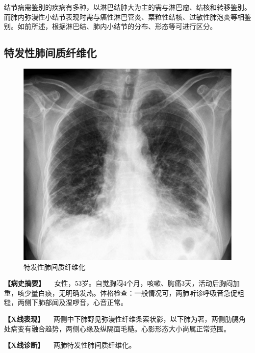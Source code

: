 结节病需鉴别的疾病有多种，以淋巴结肿大为主的需与淋巴瘤、结核和转移鉴别。而肺内弥漫性小结节表现时需与癌性淋巴管炎、粟粒性结核、过敏性肺泡炎等相鉴别。如前所述，根据淋巴结、肺内小结节的分布、形态等可进行区分。

\subsection{特发性肺间质纤维化}

\begin{figure}[!htbp]
 \centering
 \includegraphics{./images/Image00181.jpg}
 \captionsetup{justification=centering}
 \caption{特发性肺间质纤维化}
 \label{fig3-10-2}
  \end{figure} 

\textbf{【病史摘要】}
　女性，53岁。自觉胸闷4个月，咳嗽、胸痛3天，活动后胸闷加重，咳少量白痰，无明确发热。体格检查：一般情况可，两肺听诊呼吸音急促粗糙，两侧下肺部闻及湿啰音，心音正常。

\textbf{【X线表现】}
　两侧中下肺野见弥漫性纤维条索状影，以下肺为著，两侧肋膈角处病变有融合趋势，两侧心缘及纵隔面毛糙。心影形态大小尚属正常范围。

\textbf{【X线诊断】} 　两肺特发性肺间质纤维化。

